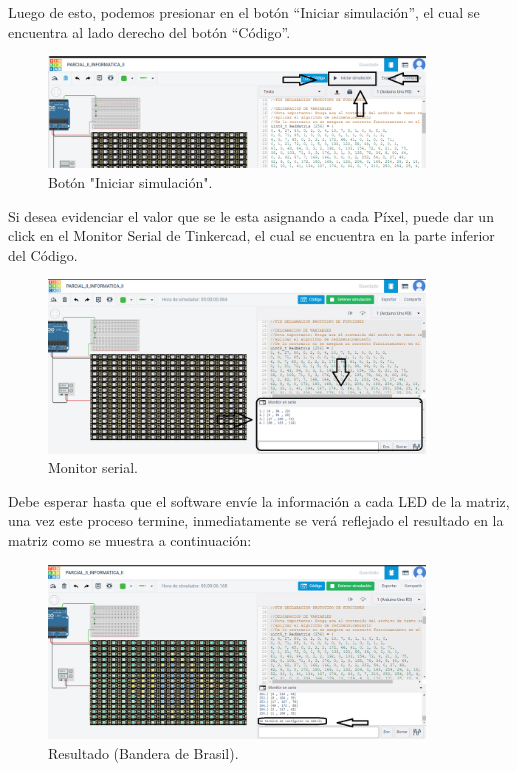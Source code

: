 \documentclass{article}
\begin{document}
Luego de esto, podemos presionar en el botón “Iniciar simulación”, el cual se encuentra al lado derecho del botón “Código”.
\begin{figure}[h]
  \includegraphics[width=10cm]{iniciar_simulacion.PNG}
  \centering
  \caption{Botón "Iniciar simulación".}
  \label{fig:iniciar_simulacion}
\end{figure}
Si desea evidenciar el valor que se le esta asignando a cada Píxel, puede dar un click en el Monitor Serial de Tinkercad, el cual se encuentra en la parte inferior del Código.
\begin{figure}[h]
  \includegraphics[width=10cm]{monitor_serial.PNG}
  \centering
  \caption{Monitor serial.}
  \label{fig:monitor_serial}
\end{figure}
Debe esperar hasta que el software envíe la información a cada LED de la matriz, una vez este proceso termine, inmediatamente se verá reflejado el resultado en la matriz como se muestra a continuación:
\begin{figure}[h]
  \includegraphics[width=10cm]{resultado.PNG}
  \centering
  \caption{Resultado (Bandera de Brasil).}
  \label{fig:Resultado}
\end{figure}


\end{document}

